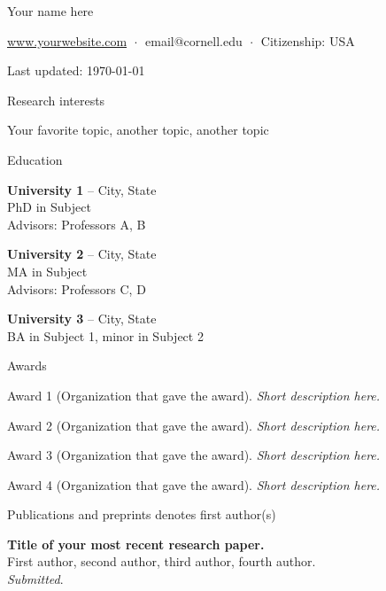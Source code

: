 \documentclass[letterpaper, 10pt]{article}
\newcommand{\heading}[1]{{\large\color{Mahogany} #1}\medskip}
\begin{document}

{\huge Your name here}\medskip
 
\href{https://en.wikibooks.org/wiki/LaTeX/Hyperlinks}{www.yourwebsite.com} $\;\boldsymbol{\cdot}\;$
email@cornell.edu $\;\boldsymbol{\cdot}\;$ 
Citizenship: USA

Last updated: \today

\bigskip\bigskip


\heading{Research interests}

Your favorite topic, another topic, another topic

\bigskip\bigskip


\heading{Education}

\textbf{University 1} -- City, State \\
PhD in Subject \\
Advisors: Professors A, B \medskip

\textbf{University 2} -- City, State \\
MA in Subject \\
Advisors: Professors C, D \medskip

\textbf{University 3} -- City, State \\
BA in Subject 1, minor in Subject 2

\bigskip\bigskip


\heading{Awards}

 Award 1 (Organization that gave the award). \textit{Short description here.}

 Award 2 (Organization that gave the award). \textit{Short description here.}

 Award 3 (Organization that gave the award). \textit{Short description here.}

 Award 4 (Organization that gave the award). \textit{Short description here.}

\bigskip\bigskip


\heading{Publications and preprints} {\small \hfill * denotes first author(s)}

\textbf{Title of your most recent research paper.} \\ 
First author, second author, third author, fourth author. \\
\textit{Submitted}. \medskip
\end{document}
